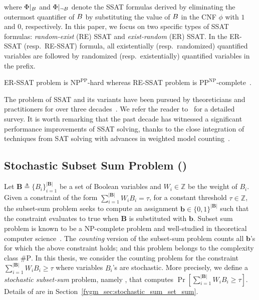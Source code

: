 where $ \Phi|_{B} $ and $ \Phi|_{\neg B} $ denote the SSAT formulas derived by eliminating the outermost quantifier of $ B $  by substituting the value of $ B $ in the CNF $ \phi $ with $ 1 $ and $ 0 $, respectively. In this paper, we focus on two specific types of SSAT formulas:  \textit{random-exist} (RE) SSAT and \textit{exist-random} (ER) SSAT. In the ER-SSAT (resp.\ RE-SSAT) formula, all existentially (resp.\ randomized) quantified variables are followed by randomized (resp.\ existentially) quantified variables in the prefix.


\begin{remark}
	ER-SSAT problem is $\mathrm{NP}^{\mathrm{PP}}$-hard whereas RE-SSAT problem is $\mathrm{PP}^{\mathrm{NP}}$-complete~\cite{littman2001stochastic}.
\end{remark}



The problem of SSAT and its variants have been pursued by theoreticians and practitioners for over three decades~\cite{majercik2005dc,fremont2017maximum,huang2006combining}. We refer the reader to~\cite{lee2017solving,lee2018solving} for a detailed survey. It is worth remarking that the past decade has witnessed a significant performance improvements of SSAT solving, thanks to the close integration of techniques from SAT solving with advances in weighted model counting~\cite{sang2004combining,chakraborty2013scalable,chakraborty2014distribution}. 


\subsection*{Stochastic Subset Sum Problem ({\stochastic})} 
Let $ \mathbf{B} \triangleq \{B_i\}_{i=1}^{|\mathbf{B}|}$ be a set of Boolean variables and $ W_i \in \mathbb{Z} $ be the weight of $ B_i $. Given a constraint of the form  $\sum_{i = 1}^ {|\mathbf{B}|} W_i B_i = \tau $, for a constant threshold $ \tau \in \mathbb{Z} $, the subset-sum problem seeks to compute an assignment $\mathbf{b} \in \{0,1\}^{|\mathbf{B}|}$ such that the constraint evaluates to true when $\mathbf{B}$ is substituted with $\mathbf{b}$. Subset sum problem is known to be a $ \mathrm{NP} $-complete problem and well-studied in theoretical computer science~\cite{kleinberg2006algorithm}. The \textit{counting} version of the subset-sum problem counts all $ \mathbf{b} $'s for which the above constraint holds; and this problem belongs to the complexity class $ \mathrm{\#P} $. In this thesis, we consider the counting problem for the constraint $\sum_{i = 1}^ {|\mathbf{B}|} W_i B_i \ge \tau $ where variables $ B_i $'s are stochastic. More precisely, we define a \textit{stochastic subset-sum} problem, namely {\stochastic}, that computes $ \Pr[\sum_{i = 1}^ {|\mathbf{B}|} W_iB_i \ge \tau] $.    Details of {\stochastic} are in Section~\ref{fvgm_sec:stochastic_sum_set_sum}.



